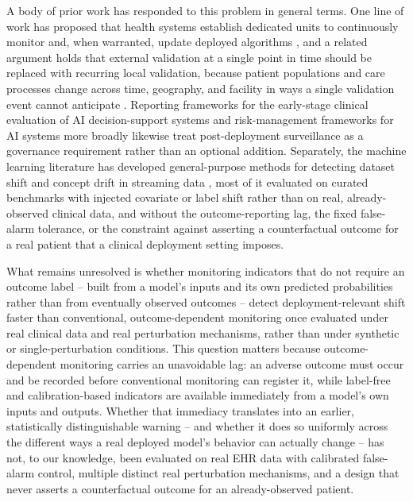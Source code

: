 \documentclass[apajournal,article,submit,oneauthor]{Definitions/mdpi}
\begin{document}
A body of prior work has responded to this problem in general terms. One line of work has proposed that health systems establish dedicated units to continuously monitor and, when warranted, update deployed algorithms \citep{feng2022}, and a related argument holds that external validation at a single point in time should be replaced with recurring local validation, because patient populations and care processes change across time, geography, and facility in ways a single validation event cannot anticipate \citep{youssef2023}. Reporting frameworks for the early-stage clinical evaluation of AI decision-support systems \citep{vasey2022} and risk-management frameworks for AI systems more broadly \citep{nist2023} likewise treat post-deployment surveillance as a governance requirement rather than an optional addition. Separately, the machine learning literature has developed general-purpose methods for detecting dataset shift and concept drift in streaming data \citep{rabanser2019,gama2014,lu2019}, most of it evaluated on curated benchmarks with injected covariate or label shift rather than on real, already-observed clinical data, and without the outcome-reporting lag, the fixed false-alarm tolerance, or the constraint against asserting a counterfactual outcome for a real patient that a clinical deployment setting imposes.

What remains unresolved is whether monitoring indicators that do not require an outcome label -- built from a model's inputs and its own predicted probabilities rather than from eventually observed outcomes -- detect deployment-relevant shift faster than conventional, outcome-dependent monitoring once evaluated under real clinical data and real perturbation mechanisms, rather than under synthetic or single-perturbation conditions. This question matters because outcome-dependent monitoring carries an unavoidable lag: an adverse outcome must occur and be recorded before conventional monitoring can register it, while label-free and calibration-based indicators are available immediately from a model's own inputs and outputs. Whether that immediacy translates into an earlier, statistically distinguishable warning -- and whether it does so uniformly across the different ways a real deployed model's behavior can actually change -- has not, to our knowledge, been evaluated on real EHR data with calibrated false-alarm control, multiple distinct real perturbation mechanisms, and a design that never asserts a counterfactual outcome for an already-observed patient.
\end{document}
